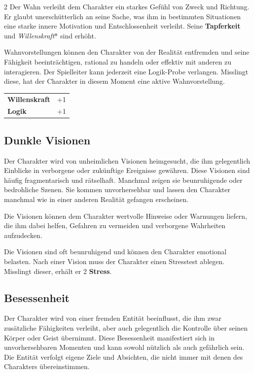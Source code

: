 \begin{multicols}{2}
    Der Wahn verleiht dem Charakter ein starkes Gefühl von Zweck und Richtung. Er glaubt unerschütterlich an seine Sache, was ihm in bestimmten Situationen eine starke innere Motivation und Entschlossenheit verleiht. Seine \textbf{Tapferkeit} und \textit{Willenskraft}* sind erhöht.

    Wahnvorstellungen können den Charakter von der Realität entfremden und seine Fähigkeit beeinträchtigen, rational zu handeln oder effektiv mit anderen zu interagieren. Der Spielleiter kann jederzeit eine Logik-Probe verlangen. Misslingt diese, hat der Charakter in diesem Moment eine aktive Wahnvorstellung.

    \begin{tabular}{@{}ll@{}}
        \textbf{Willenskraft} & +1\\
        \textbf{Logik} & +1\\
    \end{tabular}

    \subsection*{Dunkle Visionen}

    Der Charakter wird von unheimlichen Visionen heimgesucht, die ihm gelegentlich Einblicke in verborgene oder zukünftige Ereignisse gewähren. Diese Visionen sind häufig fragmentarisch und rätselhaft. Manchmal zeigen sie beunruhigende oder bedrohliche Szenen. Sie kommen unvorhersehbar und lassen den Charakter manchmal wie in einer anderen Realität gefangen erscheinen.

    Die Visionen können dem Charakter wertvolle Hinweise oder Warnungen liefern, die ihm dabei helfen, Gefahren zu vermeiden und verborgene Wahrheiten aufzudecken.

    Die Visionen sind oft beunruhigend und können den Charakter emotional belasten. Nach einer Vision muss der Charakter einen Stresstest ablegen. Misslingt dieser, erhält er 2 \textbf{Stress}.


    \subsection*{Besessenheit}

    Der Charakter wird von einer fremden Entität beeinflusst, die ihm zwar zusätzliche Fähigkeiten verleiht, aber auch gelegentlich die Kontrolle über seinen Körper oder Geist übernimmt. Diese Besessenheit manifestiert sich in unvorhersehbaren Momenten und kann sowohl nützlich als auch gefährlich sein. Die Entität verfolgt eigene Ziele und Absichten, die nicht immer mit denen des Charakters übereinstimmen.


\end{multicols}
